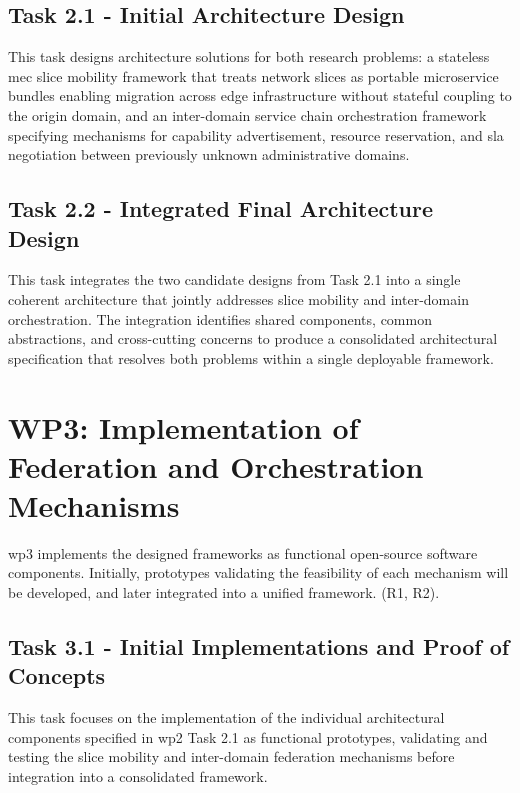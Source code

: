 \subsection{Task 2.1 - Initial Architecture Design}

This task designs architecture solutions for both research problems: a stateless \ac{mec} slice mobility framework that treats network slices as portable microservice bundles enabling migration across edge infrastructure without stateful coupling to the origin domain, and an inter-domain service chain orchestration framework specifying mechanisms for capability advertisement, resource reservation, and \ac{sla} negotiation between previously unknown administrative domains.

\subsection{Task 2.2 - Integrated Final Architecture Design}

This task integrates the two candidate designs from Task 2.1 into a single coherent architecture that jointly addresses slice mobility and inter-domain orchestration. The integration identifies shared components, common abstractions, and cross-cutting concerns to produce a consolidated architectural specification that resolves both problems within a single deployable framework.

\section{WP3: Implementation of Federation and Orchestration Mechanisms}

\ac{wp}3 implements the designed frameworks as functional open-source software components. Initially, prototypes validating the feasibility of each mechanism will be developed, and later integrated into a unified framework. (R1, R2).

\subsection{Task 3.1 - Initial Implementations and Proof of Concepts}

This task focuses on the implementation of the individual architectural components specified in \ac{wp}2 Task 2.1 as functional prototypes, validating and testing the slice mobility and inter-domain federation mechanisms before integration into a consolidated framework.

